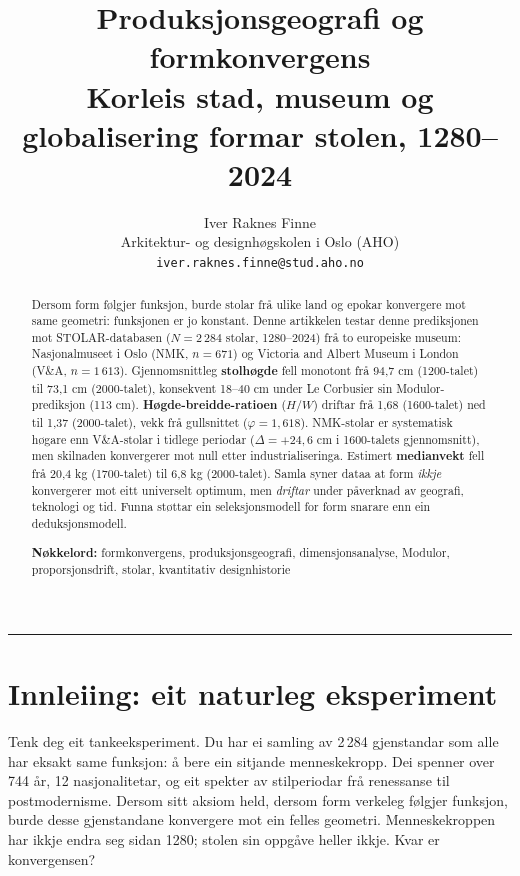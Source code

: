 \documentclass[10pt, a4paper, twocolumn]{article}
\title{%
  \textbf{Produksjonsgeografi og formkonvergens}\\[0.4em]
  \large Korleis stad, museum og globalisering formar stolen, 1280--2024%
}
\author{%
  Iver Raknes Finne\\
  \small Arkitektur- og designhøgskolen i Oslo (AHO)\\
  \small \texttt{iver.raknes.finne@stud.aho.no}
}
\date{}
\begin{document}
\maketitle

\begin{abstract}
\noindent Dersom form følgjer funksjon, burde stolar frå ulike land og epokar konvergere mot same geometri: funksjonen er jo konstant. Denne artikkelen testar denne prediksjonen mot STOLAR-databasen ($N = 2\,284$ stolar, 1280--2024) frå to europeiske museum: Nasjonalmuseet i Oslo (NMK, $n = 671$) og Victoria and Albert Museum i London (V\&A, $n = 1\,613$). Gjennomsnittleg \textbf{stolhøgde} fell monotont frå 94,7 cm (1200-talet) til 73,1 cm (2000-talet), konsekvent 18--40 cm under Le Corbusier sin Modulor-prediksjon (113 cm). \textbf{Høgde-breidde-ratioen} ($H/W$) driftar frå 1,68 (1600-talet) ned til 1,37 (2000-talet), vekk frå gullsnittet ($\varphi = 1{,}618$). NMK-stolar er systematisk høgare enn V\&A-stolar i tidlege periodar ($\Delta = +24{,}6$ cm i 1600-talets gjennomsnitt), men skilnaden konvergerer mot null etter industrialiseringa. Estimert \textbf{medianvekt} fell frå 20,4 kg (1700-talet) til 6,8 kg (2000-talet). Samla syner dataa at form \emph{ikkje} konvergerer mot eitt universelt optimum, men \emph{driftar} under påverknad av geografi, teknologi og tid. Funna støttar ein seleksjonsmodell for form snarare enn ein deduksjonsmodell.

\medskip
\noindent\textbf{Nøkkelord:} formkonvergens, produksjonsgeografi, dimensjonsanalyse, Modulor, proporsjonsdrift, stolar, kvantitativ designhistorie
\end{abstract}

\vspace{1em}
\hrule
\vspace{1.5em}


\section{Innleiing: eit naturleg eksperiment}

Tenk deg eit tankeeksperiment. Du har ei samling av 2\,284 gjenstandar som alle har eksakt same funksjon: å bere ein sitjande menneskekropp. Dei spenner over 744 år, 12 nasjonalitetar, og eit spekter av stilperiodar frå renessanse til postmodernisme. Dersom \citet{sullivan1896} sitt aksiom held, dersom form verkeleg følgjer funksjon, burde desse gjenstandane konvergere mot ein felles geometri. Menneskekroppen har ikkje endra seg sidan 1280; stolen sin oppgåve heller ikkje. Kvar er konvergensen?
\end{document}

